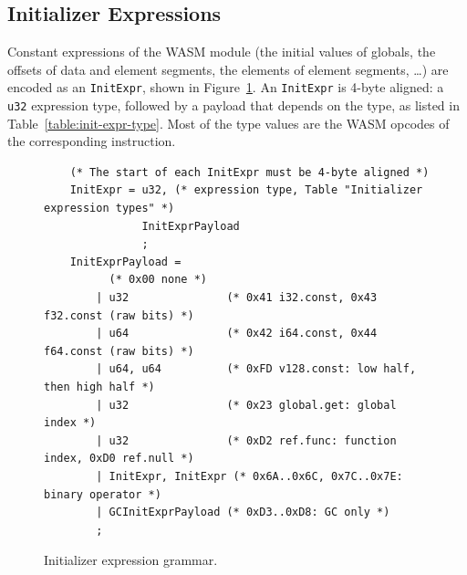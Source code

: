 \documentclass{article}
\begin{document}
\subsection{Initializer Expressions}
\label{sec:init-expr}
Constant expressions of the WASM module (the initial values of globals, the offsets of data and element segments, the elements of element segments, \dots) are encoded as an \verb|InitExpr|, shown in Figure~\ref{fig:init-expr-grammar}.
An \verb|InitExpr| is 4-byte aligned: a \verb|u32| expression type, followed by a payload that depends on the type, as listed in Table~\ref{table:init-expr-type}.
Most of the type values are the WASM opcodes of the corresponding instruction.

\begin{figure}[H]
\begin{verbatim}
    (* The start of each InitExpr must be 4-byte aligned *)
    InitExpr = u32, (* expression type, Table "Initializer expression types" *)
               InitExprPayload
               ;
    InitExprPayload =
          (* 0x00 none *)
        | u32               (* 0x41 i32.const, 0x43 f32.const (raw bits) *)
        | u64               (* 0x42 i64.const, 0x44 f64.const (raw bits) *)
        | u64, u64          (* 0xFD v128.const: low half, then high half *)
        | u32               (* 0x23 global.get: global index *)
        | u32               (* 0xD2 ref.func: function index, 0xD0 ref.null *)
        | InitExpr, InitExpr (* 0x6A..0x6C, 0x7C..0x7E: binary operator *)
        | GCInitExprPayload (* 0xD3..0xD8: GC only *)
        ;
\end{verbatim}
\caption{Initializer expression grammar.}
\label{fig:init-expr-grammar}
\end{figure}
\end{document}
